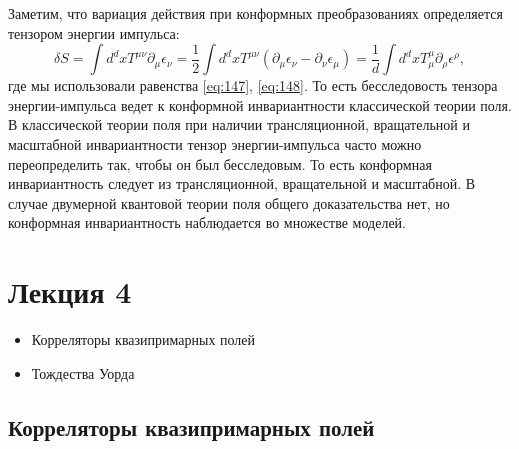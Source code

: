 \documentclass[a4paper,12pt]{article}
\theoremstyle{definition}
\theoremstyle{definition}
\theoremstyle{definition}
\begin{document}
Заметим, что  вариация действия при конформных преобразованиях определяется тензором энергии импульса:
\begin{equation}
  \label{eq:183}
  \delta S=\int d^{d}x T^{\mu\nu}\partial_{\mu}\epsilon_{\nu}=\frac{1}{2} \int d^{d}x T^{\mu\nu}(\partial_{\mu}\epsilon_{\nu}-\partial_{\nu}\epsilon_{\mu})=\frac{1}{d}\int d^{d}x T^{\mu}_{\mu}\partial_{\rho}\epsilon^{\rho},
\end{equation}
где мы использовали равенства \eqref{eq:147}, \eqref{eq:148}. То есть бесследовость тензора
энергии-импульса ведет к конформной инвариантности классической теории поля. В классической теории
поля при наличии трансляционной, вращательной и масштабной инвариантности  тензор энергии-импульса
часто можно переопределить так, чтобы он был бесследовым. То есть конформная инвариантность следует
из трансляционной, вращательной и масштабной. В случае двумерной квантовой теории поля общего
доказательства нет, но конформная инвариантность наблюдается во множестве моделей.  

\section{Лекция 4}
\label{sec:-4}

  \begin{itemize}
  \item Корреляторы квазипримарных полей
  \item Тождества Уорда
  \end{itemize}


\subsection{Корреляторы квазипримарных полей}
\label{sec:quasiprimary-correlators}
\end{document}
